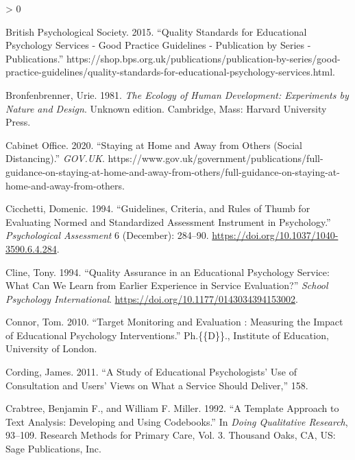 \documentclass[
]{article}
\newlength{\cslhangindent}
\newenvironment{CSLReferences}[2] %
 {%
  \setlength{\parindent}{0pt}
  \ifodd #1 \everypar{\setlength{\hangindent}{\cslhangindent}}\ignorespaces\fi
  \ifnum #2 > 0
  \setlength{\parskip}{#2\baselineskip}
  \fi
 }%
 {}
\begin{document}
\begin{CSLReferences}{1}{0}
\leavevmode\hypertarget{ref-britishpsychologicalsocietyQualityStandardsEducational2015}{}%
British Psychological Society. 2015. {``Quality {Standards} for
{Educational Psychology Services} - {Good Practice Guidelines} -
{Publication} by {Series} - {Publications}.''}
https://shop.bps.org.uk/publications/publication-by-series/good-practice-guidelines/quality-standards-for-educational-psychology-services.html.

\leavevmode\hypertarget{ref-bronfenbrennerEcologyHumanDevelopment1981}{}%
Bronfenbrenner, Urie. 1981. \emph{The {Ecology} of {Human Development}:
{Experiments} by {Nature} and {Design}}. Unknown edition. {Cambridge,
Mass}: {Harvard University Press}.

\leavevmode\hypertarget{ref-cabinetofficeStayingHomeAway2020}{}%
Cabinet Office. 2020. {``Staying at Home and Away from Others (Social
Distancing).''} \emph{GOV.UK}.
https://www.gov.uk/government/publications/full-guidance-on-staying-at-home-and-away-from-others/full-guidance-on-staying-at-home-and-away-from-others.

\leavevmode\hypertarget{ref-cicchettiGuidelinesCriteriaRules1994}{}%
Cicchetti, Domenic. 1994. {``Guidelines, {Criteria}, and {Rules} of
{Thumb} for {Evaluating Normed} and {Standardized Assessment Instrument}
in {Psychology}.''} \emph{Psychological Assessment} 6 (December):
284--90. \url{https://doi.org/10.1037/1040-3590.6.4.284}.

\leavevmode\hypertarget{ref-clineQualityAssuranceEducational1994a}{}%
Cline, Tony. 1994. {``Quality {Assurance} in an {Educational Psychology
Service}: {What Can We Learn} from {Earlier Experience} in {Service
Evaluation}?''} \emph{School Psychology International}.
\url{https://doi.org/10.1177/0143034394153002}.

\leavevmode\hypertarget{ref-connorTargetMonitoringEvaluation2010}{}%
Connor, Tom. 2010. {``Target Monitoring and Evaluation : Measuring the
Impact of Educational Psychology Interventions.''} Ph.\{\{D\}\}.,
Institute of Education, University of London.

\leavevmode\hypertarget{ref-cordingStudyEducationalPsychologists2011}{}%
Cording, James. 2011. {``A Study of {Educational Psychologists}' Use of
Consultation and Users' Views on What a Service Should Deliver,''} 158.

\leavevmode\hypertarget{ref-crabtreeTemplateApproachText1992}{}%
Crabtree, Benjamin F., and William F. Miller. 1992. {``A Template
Approach to Text Analysis: {Developing} and Using Codebooks.''} In
\emph{Doing Qualitative Research}, 93--109. Research Methods for Primary
Care, {Vol}. 3. {Thousand Oaks, CA, US}: {Sage Publications, Inc}.


\end{CSLReferences}
\end{document}
